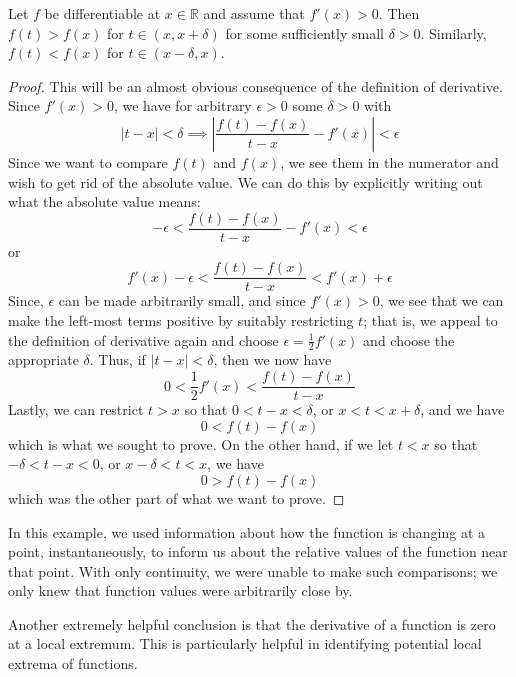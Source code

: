 \begin{prop}
Let $f$ be differentiable at $x \in \mathbb{R}$ and assume that $f'\left(x\right) > 0$. Then $f\left(t\right) > f\left(x\right)$ for $t \in \left(x,x+\delta\right)$ for some sufficiently small $\delta > 0$. Similarly, $f\left(t\right) < f\left(x\right)$ for $t\in \left(x-\delta,x\right)$.
\end{prop}
\begin{proof}
This will be an almost obvious consequence of the definition of derivative. Since $f'\left(x\right) > 0$, we have for arbitrary $\epsilon >0 $ some $\delta >0$ with $$ \left| t - x \right| < \delta \implies \left| \frac{f\left(t\right)-f\left(x\right)}{t-x} - f'\left(x\right)\right| < \epsilon $$ Since we want to compare $f\left(t\right)$ and $f\left(x\right)$, we see them in the numerator and wish to get rid of the absolute value. We can do this by explicitly writing out what the absolute value means: $$ -\epsilon < \frac{f\left(t\right)-f\left(x\right)}{t-x} - f'\left(x\right) < \epsilon $$ or $$ f'\left(x\right)-\epsilon < \frac{f\left(t\right)-f\left(x\right)}{t-x} < f'\left(x\right) + \epsilon $$ Since, $\epsilon$ can be made arbitrarily small, and since $f'\left(x\right)>0$, we see that we can make the left-most terms positive by suitably restricting $t$; that is, we appeal to the definition of derivative again and choose $\epsilon = \frac{1}{2}f'\left(x\right)$ and choose the appropriate $\delta$. Thus, if $\left|t-x\right|<\delta$, then we now have $$ 0 < \frac{1}{2}f'\left(x\right) <  \frac{f\left(t\right)-f\left(x\right)}{t-x} $$ Lastly, we can restrict $t > x$ so that $ 0 < t-x < \delta $, or $ x < t < x+ \delta $, and we have $$ 0 < f\left(t\right) - f\left(x\right) $$ which is what we sought to prove. On the other hand, if we let $t<x$ so that $-\delta < t-x < 0$, or $  x-\delta < t < x$, we have $$ 0 > f\left(t\right) - f\left(x\right) $$ which was the other part of what we want to prove.
\end{proof}

In this example, we used information about how the function is changing at a point, instantaneously, to inform us about the relative values of the function near that point. With only continuity, we were unable to make such comparisons; we only knew that function values were arbitrarily close by.

Another extremely helpful conclusion is that the derivative of a function is zero at a local extremum. This is particularly helpful in identifying potential local extrema of functions.

